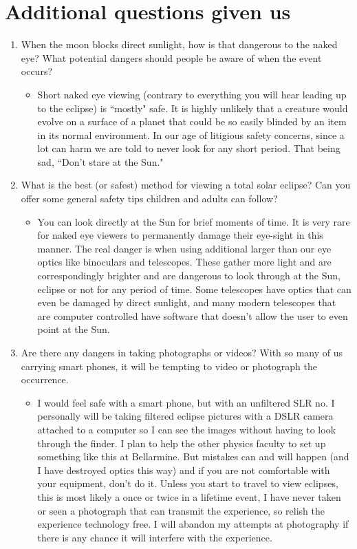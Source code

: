 \documentclass{article}
\begin{document}
\section{Additional questions given us}
\begin{enumerate}
\item When the moon blocks direct sunlight, how is that dangerous to the naked eye? What potential dangers should people be aware of when the event occurs?
	\begin{itemize}
	\item Short naked eye viewing (contrary to everything you will hear leading up to the eclipse) is ``mostly" safe. It is highly unlikely that a creature would evolve on a surface of a planet that could be so easily blinded by an item in its normal environment.  In our age of litigious safety concerns, since a lot can harm we are told to never look for any short period. That being sad, ``Don't stare at the Sun."
	\end{itemize}

\item What is the best (or safest) method for viewing a total solar eclipse? Can you offer some general safety tips children and adults can follow?
	\begin{itemize}
	\item	You can look directly at the Sun for brief moments of time.  It is very rare for naked eye viewers to permanently damage their eye-sight in this manner.  The real danger is when using additional larger than our eye optics like binoculars and telescopes.  These gather more light and are correspondingly brighter and are dangerous to look through at the Sun, eclipse or not for any period of time.  Some telescopes have optics that can even be damaged by direct sunlight, and many modern telescopes that are computer controlled have software that doesn't allow the user to even point at the Sun.
	\end{itemize}
\item Are there any dangers in taking photographs or videos? With so many of us carrying smart phones, it will be tempting to video or photograph the occurrence.
	\begin{itemize}
	\item I would feel safe with a smart phone, but with an unfiltered SLR no.  I personally will be taking filtered eclipse pictures with a DSLR camera attached to a computer so I can see the images without having to look through the finder.  I plan to help the other physics faculty to set up something like this at Bellarmine. But mistakes can and will happen (and I have destroyed optics this way) and if you are not comfortable with your equipment, don't do it.  Unless you start to travel to view eclipses, this is most likely a once or twice in a lifetime event, I have never taken or seen a photograph that can transmit the experience, so relish the experience technology free.  I will abandon my attempts at photography if there is any chance it will interfere with the experience.
	\end{itemize}


\end{enumerate}
\end{document}
